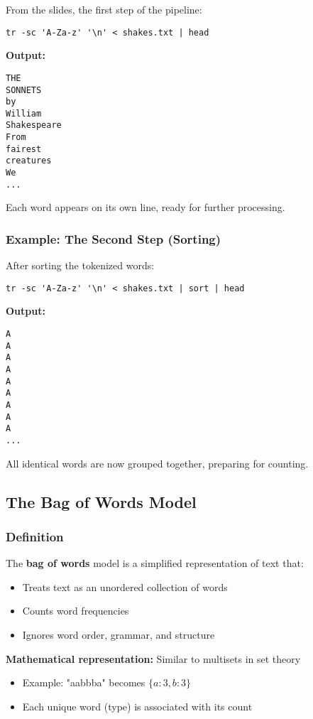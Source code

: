 \documentclass[11pt,a4paper]{article}
\theoremstyle{definition}
\theoremstyle{plain}
\theoremstyle{remark}
\begin{document}
From the slides, the first step of the pipeline:

\begin{verbatim}
tr -sc 'A-Za-z' '\n' < shakes.txt | head
\end{verbatim}

\textbf{Output:}
\begin{verbatim}
THE
SONNETS
by
William
Shakespeare
From
fairest
creatures
We
...
\end{verbatim}

Each word appears on its own line, ready for further processing.

\subsubsection{Example: The Second Step (Sorting)}

After sorting the tokenized words:

\begin{verbatim}
tr -sc 'A-Za-z' '\n' < shakes.txt | sort | head
\end{verbatim}

\textbf{Output:}
\begin{verbatim}
A
A
A
A
A
A
A
A
A
...
\end{verbatim}

All identical words are now grouped together, preparing for counting.

\subsection{The Bag of Words Model}

\subsubsection{Definition}

The \textbf{bag of words} model is a simplified representation of text that:
\begin{itemize}
    \item Treats text as an unordered collection of words
    \item Counts word frequencies
    \item Ignores word order, grammar, and structure
\end{itemize}

\textbf{Mathematical representation:} Similar to multisets in set theory
\begin{itemize}
    \item Example: "aabbba" becomes $\{a: 3, b: 3\}$
    \item Each unique word (type) is associated with its count
\end{itemize}
\end{document}
